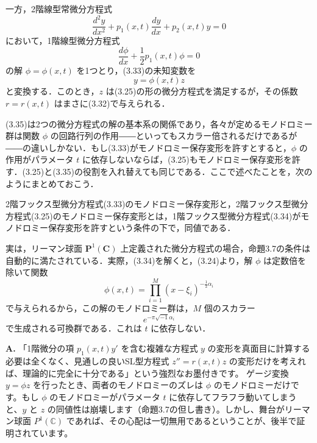 \begin{story}
一方，2階線型常微分方程式
\begin{equation}
    \frac{d^2 y}{dx^2} + p_1(x,t)\frac{dy}{dx} + p_2(x,t)y = 0 \label{eq:3.33}
\end{equation}
において，1階線型微分方程式
\begin{equation}
    \frac{d\phi}{dx} + \frac{1}{2}p_1(x,t)\phi = 0 \label{eq:3.34}
\end{equation}
の解 $\phi = \phi(x,t)$ を1つとり，(3.33)の未知変数を
\begin{equation}
    y = \phi(x,t)z \label{eq:3.35}
\end{equation}
と変換する．このとき，$z$ は(3.25)の形の微分方程式を満足するが，その係数 $r=r(x,t)$ はまさに(3.32)で与えられる．

(3.35)は2つの微分方程式の解の基本系の関係であり，各々が定めるモノドロミー群は関数 $\phi$ の回路行列の作用――といってもスカラー倍されるだけであるが――の違いしかない．もし(3.33)がモノドロミー保存変形を許すとすると，$\phi$ の作用がパラメータ $t$ に依存しないならば，(3.25)もモノドロミー保存変形を許す．(3.25)と(3.35)の役割を入れ替えても同じである．ここで述べたことを，次のようにまとめておこう．

\begin{proposition}[3.7]
2階フックス型微分方程式(3.33)のモノドロミー保存変形と，2階フックス型微分方程式(3.25)のモノドロミー保存変形とは，1階フックス型微分方程式(3.34)がモノドロミー保存変形を許すという条件の下で，同値である．
\end{proposition}

実は，リーマン球面 $\mathbf{P}^1(\mathbf{C})$ 上定義された微分方程式の場合，命題3.7の条件は自動的に満たされている．実際，(3.34)を解くと，(3.24)より，解 $\phi$ は定数倍を除いて関数
\begin{equation}
    \phi(x, t) = \prod_{i=1}^M (x-\xi_i)^{-\frac{1}{2}\alpha_i} \label{eq:3.36}
\end{equation}
で与えられるから，この解のモノドロミー群は，$M$ 個のスカラー
\begin{equation*}
    e^{-\pi\sqrt{-1}\alpha_i}
\end{equation*}
で生成される可換群である．これは $t$ に依存しない．
\end{story}

\begin{Q}
\textbf{A.} 「1階微分の項 $p_1(x,t)y'$ を含む複雑な方程式 $y$ の変形を真面目に計算する必要は全くなく、見通しの良いSL型方程式 $z'' = r(x,t)z$ の変形だけを考えれば、理論的に完全に十分である」という強烈なお墨付きです。
ゲージ変換 $y = \phi z$ を行ったとき、両者のモノドロミーのズレは $\phi$ のモノドロミーだけです。もし $\phi$ のモノドロミーがパラメータ $t$ に依存してフラフラ動いてしまうと、$y$ と $z$ の同値性は崩壊します（命題3.7の但し書き）。しかし、舞台がリーマン球面 $P^1(\mathbb{C})$ であれば、その心配は一切無用であるということが、後半で証明されています。
\end{Q}

